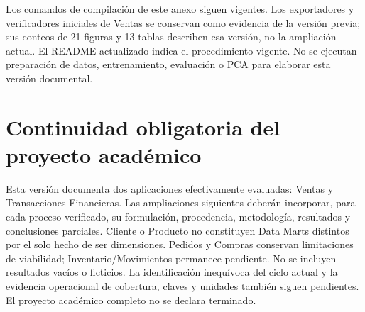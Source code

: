 Los comandos de compilación de este anexo siguen vigentes. Los exportadores y verificadores iniciales de Ventas se conservan como evidencia de la versión previa; sus conteos de 21 figuras y 13 tablas describen esa versión, no la ampliación actual. El README actualizado indica el procedimiento vigente. No se ejecutan preparación de datos, entrenamiento, evaluación o PCA para elaborar esta versión documental.

\section{Continuidad obligatoria del proyecto académico}
Esta versión documenta dos aplicaciones efectivamente evaluadas: Ventas y Transacciones Financieras. Las ampliaciones siguientes deberán incorporar, para cada proceso verificado, su formulación, procedencia, metodología, resultados y conclusiones parciales. Cliente o Producto no constituyen Data Marts distintos por el solo hecho de ser dimensiones. Pedidos y Compras conservan limitaciones de viabilidad; Inventario/Movimientos permanece pendiente. No se incluyen resultados vacíos o ficticios. La identificación inequívoca del ciclo actual y la evidencia operacional de cobertura, claves y unidades también siguen pendientes. El proyecto académico completo no se declara terminado.
